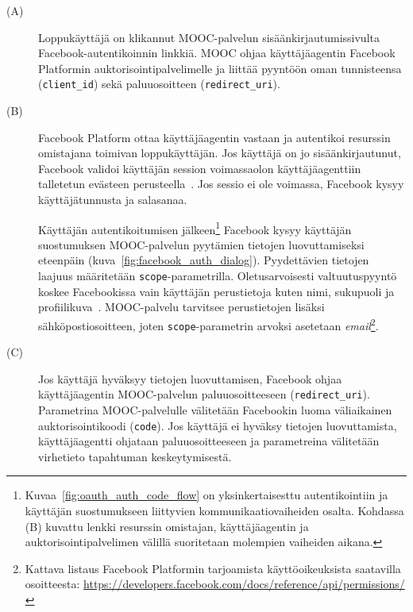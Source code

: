 \documentclass[finnish,gradu]{tktltiki}
\begin{document}
  \begin{description}
  \item[(A)]
   Loppukäyttäjä on klikannut MOOC-palvelun sisäänkirjautumissivulta Facebook-autentikoinnin linkkiä.
   MOOC ohjaa käyttäjäagentin Facebook Platformin auktorisointipalvelimelle ja liittää pyyntöön oman tunnisteensa (\verb!client_id!) sekä paluuosoitteen (\verb!redirect_uri!).

  \item[(B)]
  Facebook Platform ottaa käyttäjäagentin vastaan ja autentikoi resurssin omistajana toimivan loppukäyttäjän. Jos käyttäjä on jo sisäänkirjautunut, Facebook validoi käyttäjän session voimassaolon  käyttäjäagenttiin talletetun evästeen perusteella~\cite{facebook_oauth2_doc}. Jos sessio ei ole voimassa, Facebook kysyy käyttäjätunnusta ja salasanaa.

  Käyttäjän autentikoitumisen jälkeen\footnote{
    Kuvaa~\ref{fig:oauth_auth_code_flow} on yksinkertaisesttu autentikointiin ja käyttäjän suostumukseen liittyvien kommunikaatiovaiheiden osalta. Kohdassa (B) kuvattu lenkki resurssin omistajan, käyttäjäagentin ja auktorisointipalvelimen välillä suoritetaan molempien vaiheiden aikana.
  }
  Facebook kysyy käyttäjän suostumuksen MOOC-palvelun pyytämien tietojen luovuttamiseksi eteenpäin (kuva~\ref{fig:facebook_auth_dialog}). Pyydettävien tietojen laajuus määritetään \verb!scope!-parametrilla. Oletusarvoisesti valtuutuspyyntö koskee Facebookissa vain käyttäjän perustietoja kuten nimi, sukupuoli ja profiilikuva~\cite{facebook_oauth2_doc}. MOOC-palvelu tarvitsee perustietojen lisäksi sähköpostiosoitteen, joten \verb!scope!-parametrin arvoksi asetetaan \emph{email}\footnote{
    Kattava listaus Facebook Platformin tarjoamista käyttöoikeuksista saatavilla osoitteesta:
    \url{https://developers.facebook.com/docs/reference/api/permissions/}
  }.


  \item[(C)]

  Jos käyttäjä hyväksyy tietojen luovuttamisen, Facebook ohjaa käyttäjäagentin MOOC-palvelun paluuosoitteeseen (\verb!redirect_uri!). Parametrina MOOC-palvelulle välitetään Facebookin luoma väliaikainen auktorisointikoodi (\verb!code!).
  Jos käyttäjä ei hyväksy tietojen luovuttamista, käyttäjäagentti ohjataan paluuosoitteeseen ja parametreina välitetään virhetieto tapahtuman keskeytymisestä.


\end{description}
\end{document}
